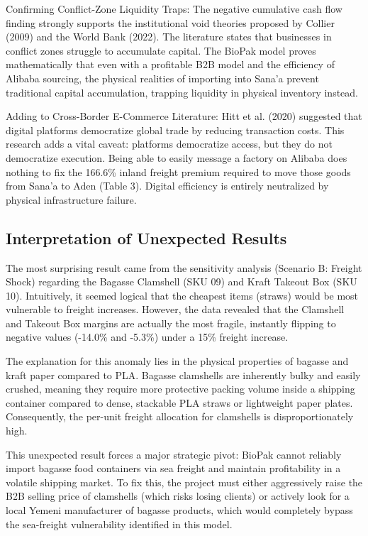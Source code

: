 \documentclass[12pt,a4paper]{article}
\begin{document}
Confirming Conflict-Zone Liquidity Traps: The negative cumulative cash flow finding strongly supports the institutional void theories proposed by Collier (2009) and the World Bank (2022). The literature states that businesses in conflict zones struggle to accumulate capital. The BioPak model proves mathematically that even with a profitable B2B model and the efficiency of Alibaba sourcing, the physical realities of importing into Sana'a prevent traditional capital accumulation, trapping liquidity in physical inventory instead.

Adding to Cross-Border E-Commerce Literature: Hitt et al. (2020) suggested that digital platforms democratize global trade by reducing transaction costs. This research adds a vital caveat: platforms democratize access, but they do not democratize execution. Being able to easily message a factory on Alibaba does nothing to fix the 166.6\% inland freight premium required to move those goods from Sana'a to Aden (Table 3). Digital efficiency is entirely neutralized by physical infrastructure failure.

\subsection{Interpretation of Unexpected Results}

The most surprising result came from the sensitivity analysis (Scenario B: Freight Shock) regarding the Bagasse Clamshell (SKU 09) and Kraft Takeout Box (SKU 10). Intuitively, it seemed logical that the cheapest items (straws) would be most vulnerable to freight increases. However, the data revealed that the Clamshell and Takeout Box margins are actually the most fragile, instantly flipping to negative values (-14.0\% and -5.3\%) under a 15\% freight increase.

The explanation for this anomaly lies in the physical properties of bagasse and kraft paper compared to PLA. Bagasse clamshells are inherently bulky and easily crushed, meaning they require more protective packing volume inside a shipping container compared to dense, stackable PLA straws or lightweight paper plates. Consequently, the per-unit freight allocation for clamshells is disproportionately high.

This unexpected result forces a major strategic pivot: BioPak cannot reliably import bagasse food containers via sea freight and maintain profitability in a volatile shipping market. To fix this, the project must either aggressively raise the B2B selling price of clamshells (which risks losing clients) or actively look for a local Yemeni manufacturer of bagasse products, which would completely bypass the sea-freight vulnerability identified in this model.
\end{document}
